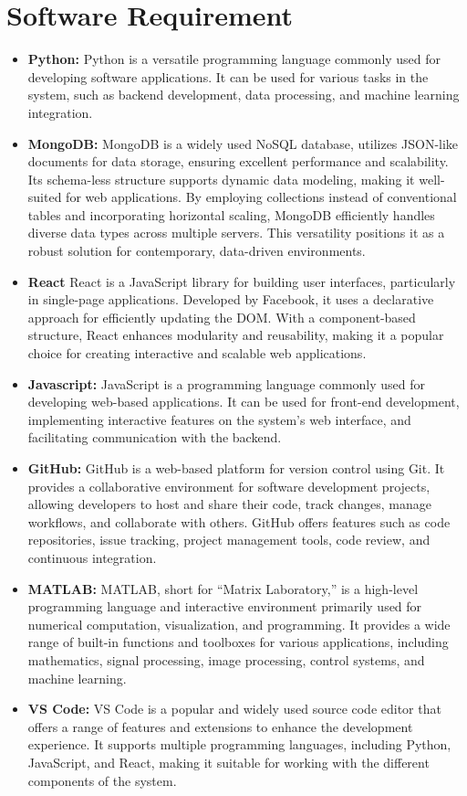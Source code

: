 \section{Software Requirement}
\begin{itemize}[noitemsep]
\item \textbf{Python:} 
Python is a versatile programming language commonly used for developing software applications. It can be used for various tasks in the system, such as backend development, data processing, and machine learning integration.
\item \textbf{MongoDB:}
MongoDB is a widely used NoSQL database, utilizes JSON-like documents for data storage, ensuring excellent performance and scalability. Its schema-less structure supports dynamic data modeling, making it well-suited for web applications. By employing collections instead of conventional tables and incorporating horizontal scaling, MongoDB efficiently handles diverse data types across multiple servers. This versatility positions it as a robust solution for contemporary, data-driven environments.
\item \textbf{React }
 React is a JavaScript library for building user interfaces, particularly in single-page applications. Developed by Facebook, it uses a declarative approach for efficiently updating the DOM. With a component-based structure, React enhances modularity and reusability, making it a popular choice for creating interactive and scalable web applications.
\item \textbf{Javascript:}
JavaScript is a programming language commonly used for developing web-based applications. It can be used for front-end development, implementing interactive features on the system’s web interface, and facilitating communication with the backend. 
\item \textbf{GitHub:}
GitHub is a web-based platform for version control using Git. It provides a collaborative environment for software development projects, allowing developers to host and share their code, track changes, manage workflows, and collaborate with others. GitHub offers features such as code repositories, issue tracking, project management tools, code review, and continuous integration.
\item \textbf{MATLAB:}
MATLAB, short for ``Matrix Laboratory,'' is a high-level programming language and interactive environment primarily used for numerical computation, visualization, and programming. It provides a wide range of built-in functions and toolboxes for various applications, including mathematics, signal processing, image processing, control systems, and machine learning.
\item \textbf{VS Code:}
VS Code is a popular and widely used source code editor that offers a range of features and extensions to enhance the development experience. It supports multiple programming languages, including Python, JavaScript, and React, making it suitable for working with the different components of the system. 
\end{itemize}


